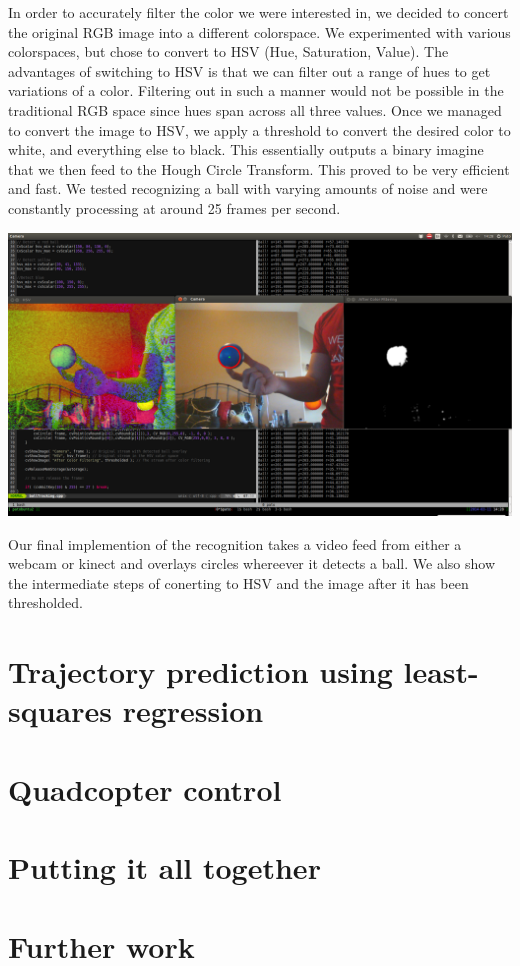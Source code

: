 \documentclass{article}
\begin{document}
In order to accurately filter the color we were interested in, we decided to concert the original
RGB image into a different colorspace. We experimented with various colorspaces, but chose to
convert to HSV (Hue, Saturation, Value). The advantages of switching to HSV is that we can filter
out a range of hues to get variations of a color. Filtering out in such a manner would not be
possible in the traditional RGB space since hues span across all three values. Once we managed
to convert the image to HSV, we apply a threshold to convert the desired color to white, and
everything else to black. This essentially outputs a binary imagine that we then feed to the
Hough Circle Transform. This proved to be very efficient and fast. We tested recognizing a ball
with varying amounts of noise and were constantly processing at around 25 frames per second.

\includegraphics[scale=0.15]{../images/DetectingBlue.png}

Our final implemention of the recognition takes a video feed from either a webcam or kinect
and overlays circles whereever it detects a ball. We also show the intermediate steps of conerting
to HSV and the image after it has been thresholded.

\section{Trajectory prediction using least-squares regression}



\section{Quadcopter control}

\section{Putting it all together}

\section{Further work}
\end{document}
